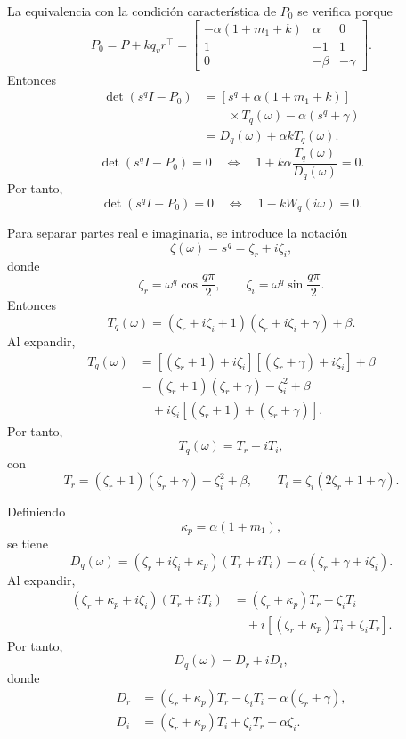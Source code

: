 \documentclass[journal]{IEEEtran}
\begin{document}
La equivalencia con la condición característica de \(P_0\) se verifica porque
\[
P_0=P+kq_vr^\top
=
\begin{bmatrix}
-\alpha(1+m_1+k)&\alpha&0\\
1&-1&1\\
0&-\beta&-\gamma
\end{bmatrix}.
\]
Entonces
\begin{align}
\det\left(s^q I-P_0\right)
&=
\left[s^q+\alpha(1+m_1+k)\right] \\
&\qquad\times T_q(\omega)-\alpha\left(s^q+\gamma\right) \nonumber\\
&=
D_q(\omega)+\alpha kT_q(\omega).
\end{align}
\[
\det\left(s^q I-P_0\right)=0
\quad\Longleftrightarrow\quad
1+k\alpha\frac{T_q(\omega)}{D_q(\omega)}=0.
\]
Por tanto,
\[
\det\left(s^q I-P_0\right)=0
\quad\Longleftrightarrow\quad
1-kW_q(i\omega)=0.
\]

Para separar partes real e imaginaria, se introduce la notación
\[
\zeta(\omega)=s^q=\zeta_r+i\zeta_i,
\]
donde
\begin{equation}
\label{eq:zeta_parts_ns}
\zeta_r=\omega^q\cos\frac{q\pi}{2},
\qquad
\zeta_i=\omega^q\sin\frac{q\pi}{2}.
\end{equation}
Entonces
\[
T_q(\omega)
=
(\zeta_r+i\zeta_i+1)(\zeta_r+i\zeta_i+\gamma)+\beta.
\]
Al expandir,
\begin{align}
T_q(\omega)
&=
\left[(\zeta_r+1)+i\zeta_i\right]\left[(\zeta_r+\gamma)+i\zeta_i\right]+\beta \nonumber\\
&=
(\zeta_r+1)(\zeta_r+\gamma)-\zeta_i^2+\beta
\nonumber\\
&\quad+
i\zeta_i\left[(\zeta_r+1)+(\zeta_r+\gamma)\right].
\end{align}
Por tanto,
\begin{equation}
\label{eq:TrTi_ns}
T_q(\omega)=T_r+iT_i,
\end{equation}
con
\begin{equation}
T_r=(\zeta_r+1)(\zeta_r+\gamma)-\zeta_i^2+\beta,
\qquad
T_i=\zeta_i(2\zeta_r+1+\gamma).
\end{equation}

Definiendo
\begin{equation}
\label{eq:kappap_ns}
\kappa_p=\alpha(1+m_1),
\end{equation}
se tiene
\[
D_q(\omega)
=
(\zeta_r+i\zeta_i+\kappa_p)(T_r+iT_i)-\alpha(\zeta_r+\gamma+i\zeta_i).
\]
Al expandir,
\[
\begin{aligned}
(\zeta_r+\kappa_p+i\zeta_i)(T_r+iT_i)
&=(\zeta_r+\kappa_p)T_r-\zeta_iT_i\\
&\quad+i\left[(\zeta_r+\kappa_p)T_i+\zeta_iT_r\right].
\end{aligned}
\]
Por tanto,
\begin{equation}
\label{eq:DrDi_ns}
D_q(\omega)=D_r+iD_i,
\end{equation}
donde
\begin{equation}
\begin{aligned}
D_r&=(\zeta_r+\kappa_p)T_r-\zeta_iT_i-\alpha(\zeta_r+\gamma),\\
D_i&=(\zeta_r+\kappa_p)T_i+\zeta_iT_r-\alpha\zeta_i.
\end{aligned}
\end{equation}
\end{document}

